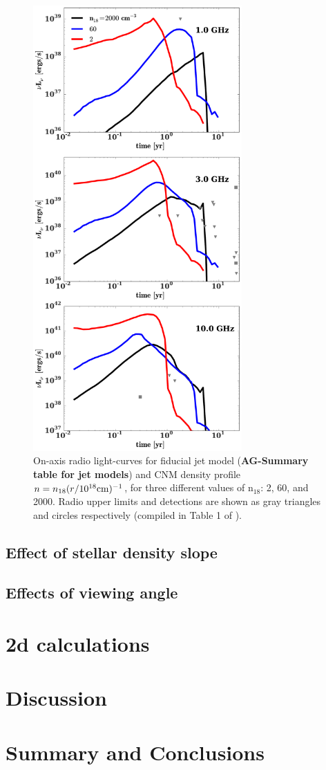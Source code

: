 \documentclass[usenatbib,fleqn]{mn2e}
\begin{document}
\begin{figure} 
  \includegraphics[width=8cm]{lightcurves.pdf}
  \caption{\label{fig:upper_limits} On-axis radio light-curves for
    fiducial jet model ({\bf AG-Summary table for jet models}) and CNM
    density profile $n=n_{18} (r/10^{18} {\rm cm})^{-1}$, for three
    different values of n$_{18}$: 2, 60, and 2000. Radio upper limits and
    detections are shown as gray triangles and circles respectively
    (compiled in Table 1 of \citealt{Mimica+2015}).}
\end{figure}

\subsection{Effect of stellar density slope}


\subsection{Effects of viewing angle}

\section{2d calculations}
\label{sec:2d}

\section{Discussion}
\label{sec:disc}

\section{Summary and Conclusions}
\label{sec:conc}

  \footnotesize{
    
    
  }
\end{document}
